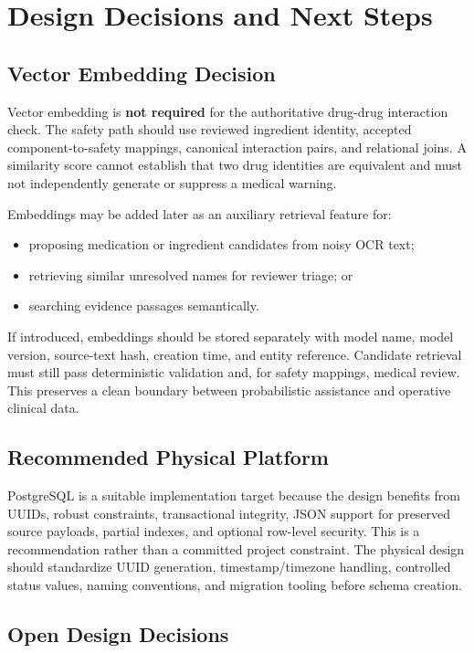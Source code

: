 \section{Design Decisions and Next Steps}

\subsection{Vector Embedding Decision}

Vector embedding is \textbf{not required} for the authoritative drug-drug interaction check. The safety path should use reviewed ingredient identity, accepted component-to-safety mappings, canonical interaction pairs, and relational joins. A similarity score cannot establish that two drug identities are equivalent and must not independently generate or suppress a medical warning.

Embeddings may be added later as an auxiliary retrieval feature for:
\begin{itemize}
  \item proposing medication or ingredient candidates from noisy OCR text;
  \item retrieving similar unresolved names for reviewer triage; or
  \item searching evidence passages semantically.
\end{itemize}

If introduced, embeddings should be stored separately with model name, model version, source-text hash, creation time, and entity reference. Candidate retrieval must still pass deterministic validation and, for safety mappings, medical review. This preserves a clean boundary between probabilistic assistance and operative clinical data.

\subsection{Recommended Physical Platform}

PostgreSQL is a suitable implementation target because the design benefits from UUIDs, robust constraints, transactional integrity, JSON support for preserved source payloads, partial indexes, and optional row-level security. This is a recommendation rather than a committed project constraint. The physical design should standardize UUID generation, timestamp/timezone handling, controlled status values, naming conventions, and migration tooling before schema creation.

\subsection{Open Design Decisions}

